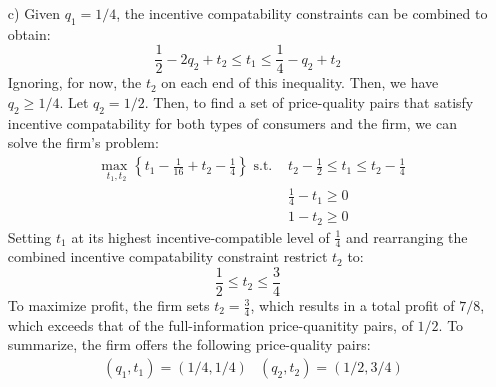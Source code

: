 \documentclass{article}
\newcommand{\usmax}[1]{\underset{#1}{\text{max }}}
\begin{document}
\begin{itemize}
	
	\item[c)] Given ${q_1=1/4}$, the incentive compatability constraints can be combined to obtain:
		\[
			\frac{1}{2} - 2q_2 + t_2\leq t_1 \leq \frac{1}{4} - q_2 + t_2
		\]
		Ignoring, for now, the $t_2$ on each end of this inequality. Then, we have ${q_2\geq1/4}$. Let ${q_2=1/2}$. Then, to find a set of price-quality pairs that satisfy incentive compatability for both types of consumers and the firm, we can solve the firm's problem:
		\begin{align*}
			&\usmax{t_1,t_2}\left\{t_1 - \frac{1}{16} + t_2 - \frac{1}{4}\right\}\text{ s.t. } 	& t_2 - \frac{1}{2}\leq t_1 \leq t_2 - \frac{1}{4}	\\
			&																					& \frac{1}{4} - t_1 \geq 0							\\
			&																					& 1 - t_2 			\geq 0
		\end{align*}
		Setting $t_1$ at its highest incentive-compatible level of $\frac{1}{4}$ and rearranging the combined incentive compatability constraint restrict $t_2$ to:
		\[
			\frac{1}{2}\leq t_2\leq \frac{3}{4}
		\]
		To maximize profit, the firm sets ${t_2=\frac{3}{4}}$, which results in a total profit of $7/8$, which exceeds that of the full-information price-quanitity pairs, of $1/2$. To summarize, the firm offers the following price-quality pairs:
		\begin{align*}
			&(q_1,t_1) = (1/4,1/4)	&(q_2,t_2) = (1/2,3/4)
		\end{align*}
		
\end{itemize}

\end{document}
